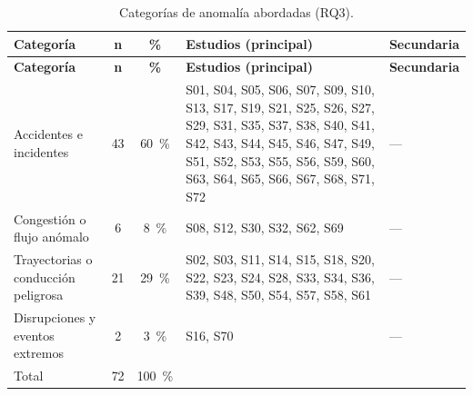 \begingroup
\small
\begin{xltabular}{\linewidth}{lccXX}
\caption{Categor\'{i}as de anomal\'{i}a abordadas (RQ3).}\label{tab:categorias}\\
\toprule
\textbf{Categor\'{i}a} & \textbf{n} & \textbf{\%} & \textbf{Estudios (principal)} & \textbf{Secundaria} \\
\midrule\endfirsthead
\toprule
\textbf{Categor\'{i}a} & \textbf{n} & \textbf{\%} & \textbf{Estudios (principal)} & \textbf{Secundaria} \\
\midrule\endhead
\bottomrule\endfoot
Accidentes e incidentes & 43 & 60~\% & S01, S04, S05, S06, S07, S09, S10, S13, S17, S19, S21, S25, S26, S27, S29, S31, S35, S37, S38, S40, S41, S42, S43, S44, S45, S46, S47, S49, S51, S52, S53, S55, S56, S59, S60, S63, S64, S65, S66, S67, S68, S71, S72 & --- \\
Congesti\'{o}n o flujo an\'{o}malo & 6 & 8~\% & S08, S12, S30, S32, S62, S69 & --- \\
Trayectorias o conducci\'{o}n peligrosa & 21 & 29~\% & S02, S03, S11, S14, S15, S18, S20, S22, S23, S24, S28, S33, S34, S36, S39, S48, S50, S54, S57, S58, S61 & --- \\
Disrupciones y eventos extremos & 2 & 3~\% & S16, S70 & --- \\
\midrule
Total & 72 & 100~\% &  &  \\
\end{xltabular}
\endgroup
